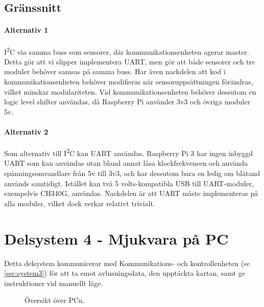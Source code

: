 \documentclass[a4paper,11pt]{article}
\begin{document}
\subsection{Gränssnitt} \label{ssec:brainInterface}

\paragraph{Alternativ 1}
I\textsuperscript{2}C via samma buss som sensorer, där kommunikationsenheten agerar master. Detta gör att vi slipper implementera UART, men gör att både sensorer och tre moduler behöver samsas på samma buss. Har även nackdelen att kod i kommunikationsenheten behöver modifieras när sensoruppsättningen förändras, vilket minskar modulariteten.
Vid kommunikationsenheten behöver dessutom en logic level shifter användas, då Raspberry Pi använder 3v3 och övriga moduler 5v.

\paragraph{Alternativ 2}
Som alternativ till I\textsuperscript{2}C kan UART användas. Raspberry Pi 3 har ingen inbyggd UART som kan användas utan bland annat låsa klockfrekvensen och använda spänningsomvandlare från 5v till 3v3, och har dessutom bara en ledig om blåtand används samtidigt. Istället kan två 5 volts-kompatibla USB till UART-moduler, exempelvis CH340G, användas. Nackdelen är att UART måste implementeras på alla moduler, vilket dock verkar relativt trivialt. %

\newpage
\section{Delsystem 4 - Mjukvara på PC} \label{sec:system4}
Detta delsystem kommunicerar med Kommunikations- och kontrollenheten (se \ref{sec:system3}) för att ta emot avlusningsdata, den upptäckta kartan, samt ge instruktioner vid manuellt läge.

\begin{figure}[h!]
    \caption{Översikt över PCn.}
    \label{fig:modules}
\end{figure}
\end{document}
